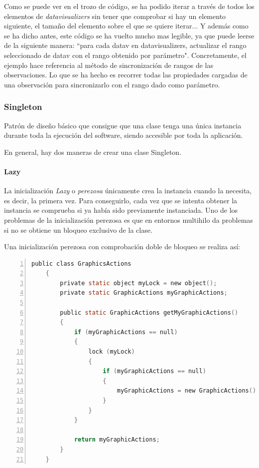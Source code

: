 Como se puede ver en el trozo de c\'odigo, se ha podido iterar a trav\'es de todos los elementos
de \emph{datavisualizers} sin tener que comprobar si hay un elemento siguiente, el tama\~no del
elemento sobre el que se quiere iterar... Y adem\'as como se ha dicho antes, este
c\'odigo se ha vuelto mucho mas legible, ya que puede leerse de la 
siguiente manera: ``para cada datav en datavisualizers,
actualizar el rango seleccionado de datav con el rango obtenido por par\'ametro".
Concretamente, el ejemplo hace referencia al m\'etodo de sincronizaci\'on de rangos de las
observaciones. Lo que se ha hecho es recorrer todas las propiedades cargadas de una observaci\'on para
sincronizarlo con el rango dado como par\'ametro.

\subsubsection{Singleton}
Patr\'on de dise\~no b\'asico que consigue que una clase tenga una \'unica instancia durante toda la ejecuci\'on del software, siendo 
accesible por toda la aplicaci\'on.

En general, hay dos maneras de crear una clase Singleton.

\paragraph{Lazy} La inicializaci\'on \emph{Lazy} o \emph{perezosa} \'unicamente crea la instancia cuando la necesita, es decir, la primera vez.
Para conseguirlo, cada vez que se intenta obtener la instancia se comprueba si ya hab\'ia sido previamente instanciada. Uno de los problemas de
la inicializaci\'on perezosa es que en entornos multihilo da problemas si no se obtiene un bloqueo exclusivo de la clase.

Una inicializaci\'on perezosa con comprobaci\'on doble de bloqueo se realiza as\'i:
\begin{lstlisting}[language=C, numbers=left, showspaces=false, breaklines=true, tabsize=2]
    public class GraphicsActions 
    {
        private static object myLock = new object();
        private static GraphicActions myGraphicActions;
        
        public static GraphicActions getMyGraphicActions()
        {
            if (myGraphicActions == null)
            {
                lock (myLock)
                {
                    if (myGraphicActions == null)
                    {
                        myGraphicActions = new GraphicActions();
                    }
                }
            }
            
            return myGraphicActions;
        }
    }
\end{lstlisting}

